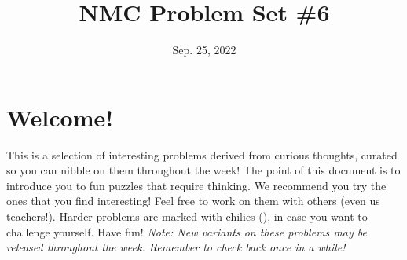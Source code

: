 \documentclass[11pt]{scrartcl}
\begin{document}
\title{NMC Problem Set \#6}
\date{Sep. 25, 2022} 
\maketitle

\section*{Welcome!}

This is a selection of interesting problems derived from curious thoughts, curated so you can nibble on them throughout the week! The point of this document is to introduce you to fun puzzles that require thinking. We recommend you try the ones that you find interesting! Feel free to work on them with others (even us teachers!). Harder problems are marked with chilies (\fullchili), in case you want to challenge yourself.
\newline\newline
Have fun! \textit{Note: New variants on these problems may be released throughout the week. Remember to check back once in a while!}
    
\end{document}
